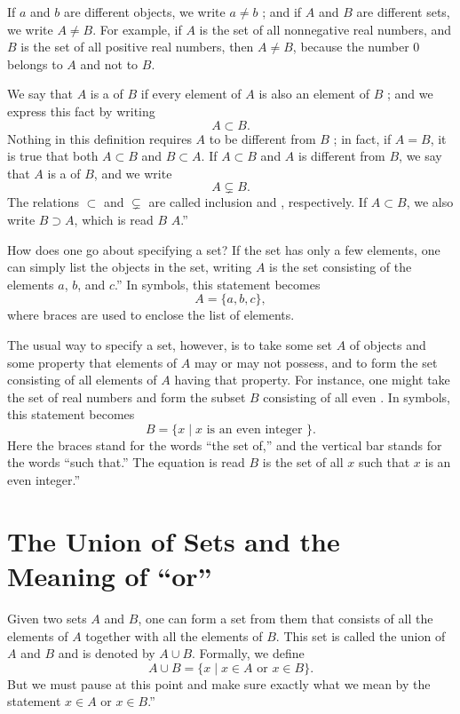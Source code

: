 If \(a\) and \(b\) are different objects, we write \(a \neq b\) ; 
and if \(A\) and \(B\) are different sets, we write \(A \neq B\). 
For example, if \(A\) is the set of all nonnegative real numbers, 
and \(B\) is the set of all positive real numbers, then \(A \neq B\), 
because the number 0 belongs to \(A\) and not to \(B\).

We say that \(A\) is a  of \(B\) if every element of \(A\) is also an element of \(B\) ; 
and we express this fact by writing
\[
A \subset B\text{.}
\]
Nothing in this definition requires \(A\) to be different from \(B\) ; 
in fact, if \(A = B\), it is true that both \(A \subset B\) and \(B \subset A\). 
If \(A \subset B\) and \(A\) is different from \(B\), 
we say that \(A\) is a  of \(B\), and we write
\[
A \varsubsetneq B\text{.}
\]
The relations \(\subset\) and \(\varsubsetneq\) are called inclusion and , 
respectively. If \(A \subset B\), we also write \(B \supset A\), 
which is read \(B\)  \(A\).''

How does one go about specifying a set? If the set has only a few elements, 
one can simply list the objects in the set, writing \(A\) is the set consisting of the elements \(a\), 
\(b\), and \(c\).'' In symbols, this statement becomes
\[
A = \{ a,b,c\},
\]
where braces are used to enclose the list of elements.

The usual way to specify a set, however, is to take some set \(A\) of objects and some property that elements of \(A\) 
may or may not possess, and to form the set consisting of all elements of \(A\) having that property. 
For instance, one might take the set of real numbers and form the subset \(B\) consisting of all even . 
In symbols, this statement becomes
\[
B = \{ x \mid x\text{ is an even integer }\}.
\]
Here the braces stand for the words ``the set of,'' and the vertical bar stands for the words ``such that.'' 
The equation is read \(B\) is the set of all \(x\) such that \(x\) is an even integer.''

\section*{The Union of Sets and the Meaning of ``or''}

Given two sets \(A\) and \(B\), one can form a set from them that consists of all the elements of \(A\) together with all 
the elements of \(B\). This set is called the union of \(A\) and \(B\) and is denoted by \(A \cup B\). 
Formally, we define
\[
A \cup B = \{ x \mid x \in A\text{ or }x \in B\}.
\]
But we must pause at this point and make sure exactly what we mean by the statement \(x \in A\) or \(x \in B\).''

